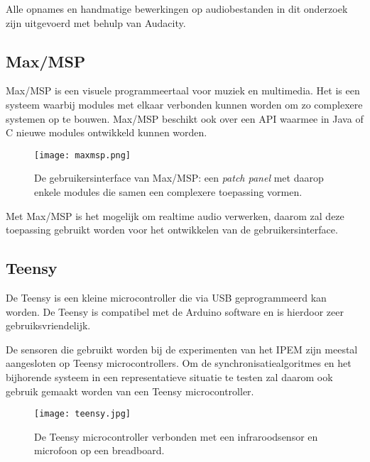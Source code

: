Alle opnames en handmatige bewerkingen op audiobestanden in dit onderzoek zijn uitgevoerd met behulp van Audacity.
\vspace{2cm}

\subsection{Max/MSP}

Max/MSP is een visuele programmeertaal voor muziek en multimedia. Het is een systeem waarbij modules met elkaar verbonden kunnen worden om zo complexere systemen op te bouwen. Max/MSP beschikt ook over een API waarmee in Java of C nieuwe modules ontwikkeld kunnen worden. \cite{cycling2016}

\vspace{0.5cm}
\begin{figure}[!h]
	\captionsetup{width=0.8\textwidth}
	\caption[Gebruikersinterface van MAX/MSP]{De gebruikersinterface van Max/MSP: een \textit{patch panel} met daarop enkele modules die samen een complexere toepassing vormen.}
	\centering
	\advance\parskip0.3cm
	\texttt{[image: maxmsp.png]}
\end{figure}
\vspace{0.5cm}

Met Max/MSP is het mogelijk om realtime audio verwerken, daarom zal deze toepassing gebruikt worden voor het ontwikkelen van de gebruikersinterface.
\vspace{1cm}

\subsection{Teensy}

De Teensy is een kleine microcontroller die via USB geprogrammeerd kan worden. De Teensy is compatibel met de Arduino software en is hierdoor zeer gebruiksvriendelijk. \cite{teensy2016}

De sensoren die gebruikt worden bij de experimenten van het IPEM zijn meestal aangesloten op Teensy microcontrollers.
Om de synchronisatiealgoritmes en het bijhorende systeem in een representatieve situatie te testen zal daarom ook gebruik gemaakt worden van een Teensy microcontroller.

\begin{figure}[!h]
	\captionsetup{width=0.7\textwidth}
	\caption[Teensy microcontroller]{De Teensy microcontroller verbonden met een infraroodsensor en microfoon op een breadboard.}
	\centering
	\advance\parskip0.3cm
	\texttt{[image: teensy.jpg]}
\end{figure}

